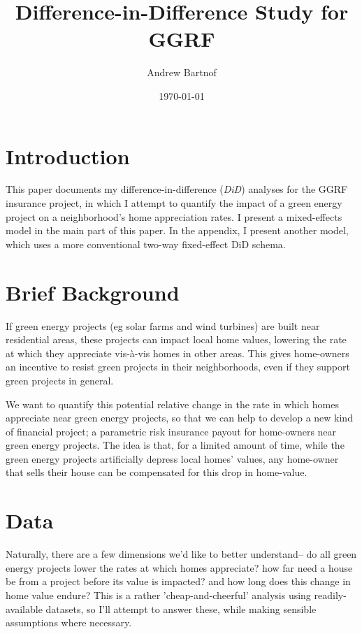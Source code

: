 \documentclass{article}
\begin{document}
\author{Andrew Bartnof}
\title{Difference-in-Difference Study for GGRF}
\date{\today}
\maketitle

\section{Introduction}

This paper documents my difference-in-difference (\emph{DiD}) analyses for the GGRF insurance project, in which I attempt to quantify the impact of a green energy project on a neighborhood's home appreciation rates.
I present a mixed-effects model in the main part of this paper.
In the appendix, I present another model, which uses a more conventional two-way fixed-effect DiD schema.

\section{Brief Background}

If green energy projects (eg solar farms and wind turbines) are built near residential areas, these projects can impact local home values, lowering the rate at which they appreciate vis-\`a-vis homes in other areas.
This gives home-owners an incentive to resist green projects in their neighborhoods, even if they support green projects in general.

We want to quantify this potential relative change in the rate in which homes appreciate near green energy projects, so that we can help to develop a new kind of financial project; a parametric risk insurance payout for home-owners near green energy projects.
The idea is that, for a limited amount of time, while the green energy projects artificially depress local homes' values, any home-owner that sells their house can be compensated for this drop in home-value.


\section{Data}

Naturally, there are a few dimensions we'd like to better understand-- do all green energy projects lower the rates at which homes appreciate? how far need a house be from a project before its value is impacted? and how long does this change in home value endure?
This is a rather 'cheap-and-cheerful' analysis using readily-available datasets, so I'll attempt to answer these, while making sensible assumptions where necessary.
\end{document}
